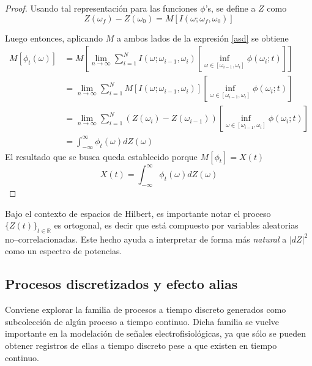 \documentclass[12pt,letterpaper]{book}
\newcommand{\R}{\mathbb{R}}
\newcommand{\intR}{\int_{-\infty}^{\infty}}
\newcommand{\abso}[1]{\left| #1 \right|}
\begin{document}
\begin{proof}
Usando tal representación para las funciones $\phi$'s, se define a $Z$ como
\begin{equation}
Z(\omega_f) - Z(\omega_0) = M\left[ I(\omega; \omega_f, \omega_0) \right]
\end{equation}

Luego entonces, aplicando $M$ a ambos lados de la expresión \ref{asd} se obtiene
\begin{align*}
M\left[ \phi_t(\omega) \right] &= M\left[ \lim_{n\rightarrow\infty} \sum_{i=1}^{N} I(\omega; \omega_{i-1}, \omega_i) \left[  \inf_{\omega \in [\omega_{i-1},\omega_i]} \phi(\omega_{i}; t)\right] \right] \\
&= \lim_{n\rightarrow\infty} \sum_{i=1}^{N} M\left[I(\omega; \omega_{i-1}, \omega_i) \right] \left[  \inf_{\omega \in [\omega_{i-1},\omega_i]} \phi(\omega_{i}; t)\right] \\
&= \lim_{n\rightarrow\infty} \sum_{i=1}^{N} \left( Z(\omega_i) - Z(\omega_{i-1})\right) \left[  \inf_{\omega \in [\omega_{i-1},\omega_i]} \phi(\omega_{i}; t)\right] \\
&= \intR \phi_t(\omega) dZ(\omega)
\end{align*}
El resultado que se busca queda establecido porque $M[\phi_t] = X(t)$
\begin{equation}
X(t) = \intR \phi_t(\omega) dZ(\omega)
\end{equation}
\end{proof}

Bajo el contexto de espacios de Hilbert, es importante notar el proceso $\{Z(t)\}_{t\in \R}$ es ortogonal, es decir que está compuesto por variables aleatorias no--correlacionadas.
%
Este hecho ayuda a interpretar de forma más \textit{natural} a $\abso{dZ}^2$ como un espectro de potencias.


\newpage
\subsection{Procesos discretizados y efecto alias}

Conviene explorar la familia de procesos a tiempo discreto generados como subcolección de algún proceso a tiempo continuo. 
%
Dicha familia se vuelve importante en la modelación de señales electrofisiológicas, ya que sólo se pueden obtener registros de ellas a tiempo discreto pese a que existen en tiempo continuo.
\end{document}
